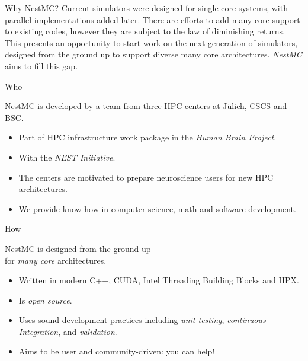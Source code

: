 \documentclass[a0paper,portrait]{baposter}
\newcommand{\julich}{J\"ulich\xspace}
\newcommand{\newemph}[1]{{\color{blue!40!black}\em #1}}
\begin{document}
\begin{poster}
\begin{posterbox}[name=motivation,column=0,row=0,span=2]{Why NestMC?}
    Current simulators were designed for single core systems, with parallel implementations added later.
    There are efforts to add many core support to existing codes, however they are subject to the law of diminishing returns.
    This presents an opportunity to start work on the next generation of simulators, designed from the ground up to support diverse many core architectures.
    \newemph{NestMC} aims to fill this gap.

\end{posterbox}

\begin{posterbox}[name=who,column=0,below=motivation,span=1]{Who}
    \begin{center}
        NestMC is developed by a team from three HPC centers at \julich, CSCS and BSC.
    \end{center}
    \vspace{-10pt}
    \begin{itemize}
        \item Part of HPC infrastructure work package in the \newemph{Human Brain Project}.
        \item With the \newemph{NEST Initiative}.
        \item The centers are motivated to prepare neuroscience users for new HPC architectures.
        \item We provide know-how in computer science, math and software development.
    \end{itemize}
\end{posterbox}

\begin{posterbox}[name=how,column=1,below=motivation,span=1]{How}
    \begin{center}
        NestMC is designed from the ground up\\for \newemph{many core}  architectures.
    \end{center}
    \vspace{-10pt}
    \begin{itemize}
        \item Written in modern C++, CUDA, Intel Threading Building Blocks and HPX.
        \item Is \newemph{open source}.
        \item Uses sound development practices including \newemph{unit testing}, \newemph{continuous Integration}, and \newemph{validation}.
        \item Aims to be user and community-driven: you can help!
    \end{itemize}
\end{posterbox}


\end{poster}
\end{document}
